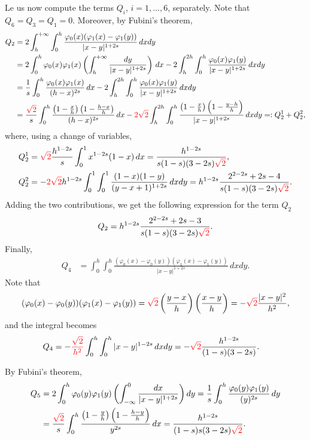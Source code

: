 \documentclass[10 pt]{article}
\numberwithin{equation}{section}
\newcommand{\B}[1]{{\color{red} #1}}  %
\begin{document}
Le us now compute the terms $Q_i$, $i=1,\ldots,6$, separately.   Note that $Q_6=Q_3=Q_1 = 0.$ Moreover, by Fubini's theorem,
\begin{align*}
	Q_2 &= 2\int_{h}^{+\infty}\int_{0}^{h} \frac{\varphi_0(x)(\varphi_{1}(x)-\varphi_{1}(y))}{|x-y|^{1+2s}}\,dxdy\\
	&= 2\int_{0}^{h}\varphi_0(x)\varphi_{1}(x)\left(\int_{h}^{+\infty} \frac{dy}{|x-y|^{1+2s}}\right)\,dx - 2\int_{h}^{2h}\int_{0}^{h} \frac{\varphi_0(x)\varphi_{1}(y)}{|x-y|^{1+2s}}\,dxdy 
	\\
	&= \frac{1}{s}\int_{0}^{h}\frac{\varphi_0(x)\varphi_{1}(x)}{(h-x)^{2s}}\,dx - 2\int_{h}^{2h}\int_{0}^{h} \frac{\varphi_0(x)\varphi_{1}(y)}{|x-y|^{1+2s}}\,dxdy
	\\
	&= \frac{\B{\sqrt{2}}}{s}\int_{0}^{h}\frac{\left(1-\frac{x}{h}\right)\left(1-\frac{h-x}{h}\right)}{(h-x)^{2s}}\,dx - \B{2\sqrt{2}}\int_{h}^{2h}\int_{0}^{h} \frac{\left(1-\frac{x}{h}\right)\left(1-\frac{y-h}{h}\right)}{|x-y|^{1+2s}}\,dxdy=:Q_2^1+Q_2^2,
\end{align*}
where, using a change of variables,
\begin{align*}
Q_2^1&=\B{\sqrt{2}}\frac{h^{1-2s}}{s}\int_0^1 x^{1-2s}(1-x)\,dx = \frac{h^{1-2s}}{s(1-s)(3-2s)\B{\sqrt{2}}},\\
Q_2^2 &= -\B{2\sqrt{2}}h^{1-2s}\int_0^1\int_0^1\frac{(1-x)(1-y)}{(y-x+1)^{1+2s}}\,dxdy = h^{1-2s}\frac{2^{2-2s}+2s-4}{s(1-s)(3-2s)\B{\sqrt{2}}}.
\end{align*}
Adding the two contributions, we get the following expression for the term $Q_2$
\begin{align*}
	Q_2 = h^{1-2s}\frac{2^{2-2s}+2s-3}{s(1-s)(3-2s)\B{\sqrt{2}}}.
\end{align*}
Finally, 
\begin{align*}
	Q_4 &= \int_{0}^{h}\int_{0}^{h} \frac{(\varphi_0(x)-\varphi_0(y))(\varphi_{1}(x)-\varphi_{1}(y))}{|x-y|^{1+2s}}\,dxdy. 
\end{align*}
Note that
\begin{align*}
	(\varphi_0(x)-\varphi_0(y))(\varphi_{1}(x)-\varphi_{1}(y)) = \B{\sqrt{2}}\left(\frac{y-x}{h}\right)\left(\frac{x-y}{h}\right) = -\B{\sqrt{2}}\frac{|x-y|^2}{h^2},
\end{align*}
and the integral becomes
\begin{align*}
	Q_4 &= -\B{\frac{\sqrt{2}}{h^2}}\int_{0}^{h}\int_{0}^{h} |x-y|^{1-2s}\,dxdy = -\B{\sqrt{2}}\frac{h^{1-2s}}{(1-s)(3-2s)}.
\end{align*}

By Fubini's theorem,
\begin{align*}
	Q_5 &= 2\int_{0}^{h}\varphi_0(y)\varphi_{1}(y)\left(\int_{-\infty}^{0} \frac{dx}{|x-y|^{1+2s}}\right)dy = \frac{1}{s}\int_{0}^{h}\frac{\varphi_0(y)\varphi_{1}(y)}{(y)^{2s}}\,dy \\
	&= \frac{\B{\sqrt{2}}}{s}\int_{0}^{h}\frac{\left(1-\frac{y}{h}\right)\left(1-\frac{h-y}{h}\right)}{y^{2s}}\,dx=\frac{h^{1-2 s}}{(1-s) s (3-2 s)\B{\sqrt{2}}}.
\end{align*}
\end{document}
